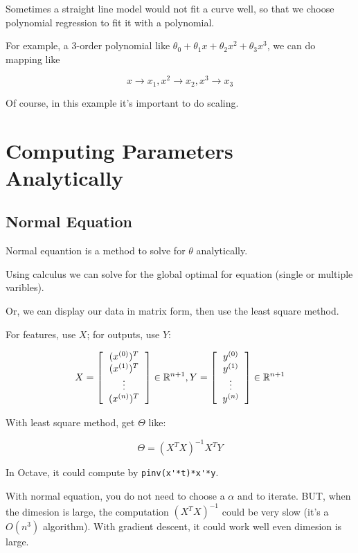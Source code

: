 \documentclass[en,11pt,english,black,simple]{../elegantbook}
\begin{document}
Sometimes a straight line model would not fit a curve well, so that we choose polynomial regression to fit it with a polynomial.

For example, a 3-order polynomial like \(\theta_0 + \theta_1 x + \theta_2 x^2 + \theta_3 x^3\), we can do mapping like 

\[x \rightarrow x_1, x^2 \rightarrow x_2, x^3 \rightarrow x_3\]

Of course, in this example it's important to do scaling.

\section{Computing Parameters Analytically}

\subsection{Normal Equation}

Normal equantion is a method to solve for \(\theta\) analytically.

Using calculus we can solve for the global optimal for equation (single or multiple varibles).

Or, we can display our data in matrix form, then use the least square method.

For features, use \(X\); for outputs, use \(Y\):

\[
    X = \left[\begin{tabular}{c}
        \((x^{(0)})^T\)\\
        \((x^{(1)})^T\)\\
        \(\vdots\)\\
        \((x^{(n)})^T\)\\
    \end{tabular}\right] \in \mathbb{R}^{n+1},
    Y = \left[\begin{tabular}{c}
        \(y^{(0)}\)\\
        \(y^{(1)}\)\\
        \(\vdots\)\\
        \(y^{(n)}\)\\
    \end{tabular}\right] \in \mathbb{R}^{n+1}
\]

With least square method, get \(\Theta\) like:

\[\Theta = (X^T X)^{-1}X^T Y\]

In Octave, it could compute by \lstinline{pinv(x'*t)*x'*y}.

With normal equation, you do not need to choose a \(\alpha\) and to iterate. BUT, when the dimesion is large, the computation \((X^T X)^{-1}\) could be very slow (it's a \(O(n^3)\) algorithm). With gradient descent, it could work well even dimesion is large.
\end{document}
